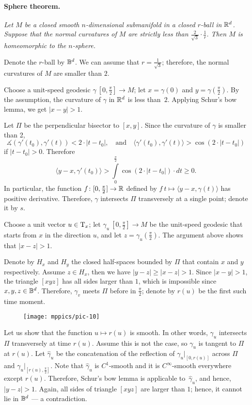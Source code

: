\documentclass[a4paper,10pt]{article}
\begin{document}
\paragraph{Sphere theorem.}
\label{thm:strict}
\textit{Let $M$ be a closed smooth $n$-dimensional submanifold in a closed $r$-ball in $\mathbb{R}^d$.
Suppose that the normal curvatures of $M$ are strictly less than $\tfrac2{\sqrt{3}}\cdot\tfrac1r$.
Then $M$ is homeomorphic to the $n$-sphere.}


Denote the $r$-ball by $\mathbb{B}^d$.
We can assume that $r=\tfrac1{\sqrt{3}}$;
therefore, the normal curvatures of $M$ are smaller than $2$.

Choose a unit-speed geodesic $\gamma\:[0,\tfrac\pi2]\to M$;
let $x=\gamma(0)$ and $y=\gamma(\tfrac\pi2)$.
By the assumption, the curvature of $\gamma$ in $\mathbb{R}^d$ is less than~$2$.
Applying Schur's bow lemma, we get $|x-y|>1$.

Let $\Pi$ be the perpendicular bisector to $[x,y]$.
Since the curvature of $\gamma$ is smaller than 2,
\[\measuredangle(\gamma'(t_0),\gamma'(t))< 2\cdot|t-t_0|,
\quad\text{and}\quad
\langle \gamma'(t_0),\gamma'(t) \rangle> \cos (2\cdot|t-t_0|)\] if $|t-t_0|>0$.
Therefore
\[\langle y-x,\gamma'(t_0) \rangle>\int\limits_0^{\frac\pi2}\cos (2\cdot |t-t_0|)\cdot dt\ge0.\]
In particular, the function $f\colon[0,\tfrac\pi2]\to\mathbb{R}$ defined by
$f\:t\mapsto \langle y-x,\gamma(t) \rangle$
has positive derivative.
Therefore, $\gamma$ intersects $\Pi$ transversely at a single point;
denote it by $s$.



Choose a unit vector $u\in\mathrm{T}_x$;
let $\gamma_u\:[0,\tfrac\pi2]\to M$ be the unit-speed geodesic that starts from $x$ in the direction $u$, and let $z=\gamma_u(\tfrac\pi2)$.
The argument above shows that $|x-z|>1$.

Denote by $H_x$ and $H_y$ the closed half-spaces bounded by $\Pi$ that contain $x$ and $y$ respectively.
Assume $z\in H_x$, then we have $|y-z|\ge |x-z|>1$.
Since $|x-y|>1$, the triangle $[xyz]$ has all sides larger than $1$,
which is impossible since $x,y,z\in \mathbb{B}^d$.
Therefore, $\gamma_v$ meets $\Pi$ before in $\tfrac\pi2$;
denote by $r(u)$ be the first such time moment.

\begin{wrapfigure}{r}{44 mm}
\vskip-0mm
\centering
\texttt{[image: mppics/pic-10]}
\vskip2mm
\end{wrapfigure}

Let us show that the function $u\mapsto r(u)$ is smooth.
In other words, $\gamma_u$ intersects $\Pi$ transversely at time $r(u)$.
Assume this is not the case, so $\gamma_u$ is tangent to $\Pi$ at $r(u)$.
Let $\hat\gamma_u$ be the concatenation of the reflection of $\gamma_u|_{[0,r(u)]}$ across $\Pi$ and $\gamma_u|_{[r(u),\frac\pi2]}$.
Note that $\hat \gamma_u$ is $C^1$-smooth and it is $C^\infty$-smooth everywhere except $r(u)$.
Therefore, Schur's bow lemma is applicable to~$\hat \gamma_u$, and hence, $|y-z|>1$.
Again, all sides of triangle $[xyz]$ are larger than $1$;
hence, it cannot lie in $\mathbb{B}^d$ --- a contradiction.  
\end{document}
